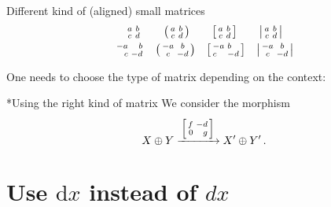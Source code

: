 \begin{showlatex}{Different kind of (aligned) small matrices}
\begin{gather*}
  \begin{smallmatrix}
    a & b \\
    c & d
  \end{smallmatrix}
  \qquad
  \begin{psmallmatrix}
    a & b \\
    c & d
  \end{psmallmatrix}
  \qquad
  \begin{bsmallmatrix}
    a & b \\
    c & d
  \end{bsmallmatrix}
  \qquad
  \begin{vsmallmatrix}
    a & b \\
    c & d
  \end{vsmallmatrix}
\\
  \begin{smallmatrix*}[r]
    -a &  b \\
      c & -d
  \end{smallmatrix*}
  \quad
  \begin{psmallmatrix*}[c]
    -a &  b \\
      c & -d
  \end{psmallmatrix*}
  \quad
  \begin{bsmallmatrix*}[l]
    -a &  b \\
      c & -d
  \end{bsmallmatrix*}
  \quad
  \begin{vsmallmatrix}
    -a &  b \\
      c & -d
  \end{vsmallmatrix}
\end{gather*}
\end{showlatex}
One needs to choose the type of matrix depending on the context:
\begin{showlatex}*{Using the right kind of matrix}
We consider the morphism
\[
  X \oplus Y
  \xrightarrow{\,
    \begin{bsmallmatrix*}[r]
      f & -d \\
      0 &  g
    \end{bsmallmatrix*}
    \,
  }
  X' \oplus Y' \,.
\]
\end{showlatex}





\section{Use \texorpdfstring{$\mathrm{d}x$}{dx} instead of \texorpdfstring{$dx$}{dx}}

